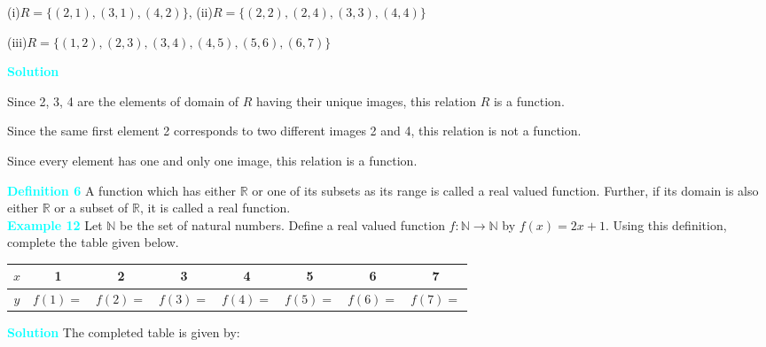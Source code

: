 \documentclass[11pt]{article}
\begin{document}
\begin{center}
(i)\quad $R = \{(2,1),(3,1),(4,2)\}$, (ii)\quad $R = \{(2,2),(2,4),(3,3),(4,4)\}$
\end{center}
\begin{center}
    (iii)\quad $R = \{(1,2),(2,3),(3,4),(4,5),(5,6),(6,7)\}$
\end{center}
\vspace{0.35cm}
\noindent\textcolor{cyan}{\textbf{Solution}}
\begin{enumerate*}[label=(\roman*), itemjoin=\quad, itemjoin*=\quad]
\item Since 2, 3, 4 are the elements of domain of $R$ having their unique images, this relation $R$ is a function.\\
\item Since the same first element 2 corresponds to two different images 2 and 4, this relation is not a function.\\
\item Since every element has one and only one image, this relation is a function.
\end{enumerate*}
\vspace{0.45cm}

\colorbox{ncertblue}{\textcolor{cyan}{\textbf{Definition 6}}}\hspace{0.5em} A function which has either $\mathbb{R}$ or one of its subsets as its range is called a real valued function. Further, if its domain is also either $\mathbb{R}$ or a subset of $\mathbb{R}$, it is called a real function.\\
 \textcolor{cyan}{\textbf{Example 12}} 
Let $\mathbb{N}$ be the set of natural numbers. Define a real valued function
$f : \mathbb{N} \to \mathbb{N}$ by $f(x) = 2x + 1$. Using this definition,
complete the table given below.

\medskip
\begin{center}
    \renewcommand{\arraystretch}{1.4}
\begin{tabular}{|c|c|c|c|c|c|c|c|}
\hline
\rowcolor{ncertblue}
$x$ & 1 & 2 & 3 & 4 & 5 & 6 & 7 \\ \hline
\rowcolor{ncertblue}
$y$ & $f(1)=$ & $f(2)=$ & $f(3)=$ & $f(4)=$ & $f(5)=$ & $f(6)=$ & $f(7)=$ \\ \hline
\end{tabular}
\end{center}


\vspace{15pt}
\noindent \textcolor{cyan}{\textbf{Solution}} The completed table is given by:
\end{document}
